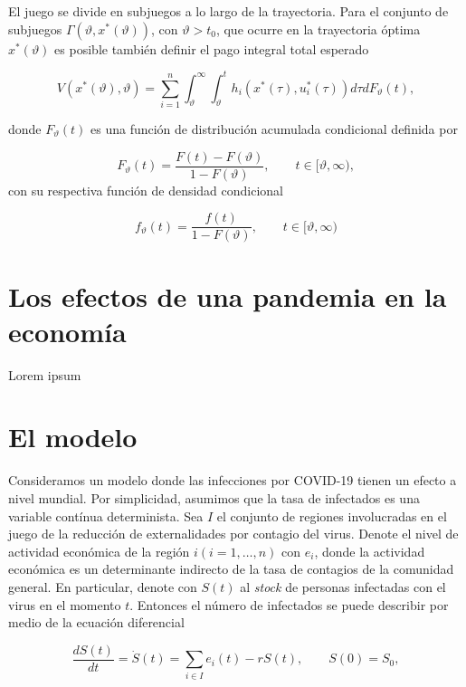 \documentclass[11pt, oneside]{article}
\begin{document}
El juego se divide en subjuegos a lo largo de la trayectoria. Para el conjunto de subjuegos $\Gamma(\vartheta, x^*(\vartheta))$, con $\vartheta > t_0$, que ocurre en la trayectoria óptima $x^*(\vartheta)$ es posible también definir el pago integral total esperado 

\begin{equation}
	V(x^*(\vartheta), \vartheta) = \sum_{i=1}^n \int_{\vartheta}^\infty \int_{\vartheta}^t h_i(x^*(\tau), u_i^*(\tau))d\tau dF_\vartheta(t),
\end{equation}

donde $F_\vartheta(t)$ es una función de distribución acumulada condicional definida por

\begin{equation}
	F_\vartheta(t) = \frac{F(t) - F(\vartheta)}{1 - F(\vartheta)}, \qquad t \in [\vartheta, \infty),
\end{equation}
con su respectiva función de densidad condicional

\begin{equation}
	f_\vartheta(t) = \frac{f(t)}{1 - F(\vartheta)}, \qquad t \in [\vartheta, \infty)
\end{equation}


\section{Los efectos de una pandemia en la economía}

Lorem ipsum

\section{El modelo}

Consideramos un modelo donde las infecciones por COVID-19 tienen un efecto a nivel mundial. Por simplicidad, asumimos que la tasa de infectados es una variable contínua determinista. Sea $I$ el conjunto de regiones involucradas en el juego de la reducción de externalidades por contagio del virus. Denote el nivel de actividad económica de la región $i (i = 1,\dots,n)$ con $e_i$, donde la actividad económica es un determinante indirecto de la tasa de contagios de la comunidad general. En particular, denote con $S(t)$ al \emph{stock} de personas infectadas con el virus en el momento $t$. Entonces el número de infectados se puede describir por medio de la ecuación diferencial 

\begin{equation}
	\frac{d S(t)}{dt} = \dot{S}(t) = \sum_{i \in I} e_i(t) - r S(t), \qquad S(0) = S_0,
\end{equation}
\end{document}

